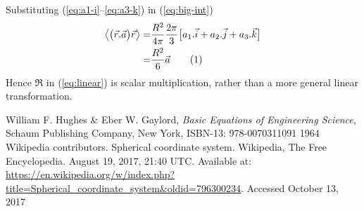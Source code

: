\documentclass[]{article}
\newcommand\numberthis{\addtocounter{equation}{1}\tag{\theequation}}
\begin{document}
Substituting (\ref{eq:a1-i}--\ref{eq:a3-k})  in (\ref{eq:big-int})
\begin{align*}
\left\langle \big(\vec{r}.\vec{a}\big)\vec{r} \right\rangle=&\frac{ R^2}{4\pi}\frac{2\pi}{3}\big[a_1.\vec{i}+a_2.\vec{j}+a_3.\vec{k}\big]\\
=&\frac{R^2}{6}\vec{a} \numberthis \label{eq:final}
\end{align*}
Hence $\mathfrak{R}$ in (\ref{eq:linear}) is scalar multiplication, rather than a more general linear transformation.

\begin{thebibliography}{9}
	\raggedright
	William F. Hughes \& Eber W. Gaylord,
	\emph{Basic Equations of Engineering Science},
	Schaum Publishing Company, New York,
	ISBN-13: 978-0070311091
	1964
	Wikipedia contributors. Spherical coordinate system. Wikipedia, The Free Encyclopedia. August 19, 2017, 21:40 UTC. Available at: 
	\url{https://en.wikipedia.org/w/index.php?title=Spherical_coordinate_system&oldid=796300234}.
	Accessed
	October 13, 2017
\end{thebibliography}
\end{document}
